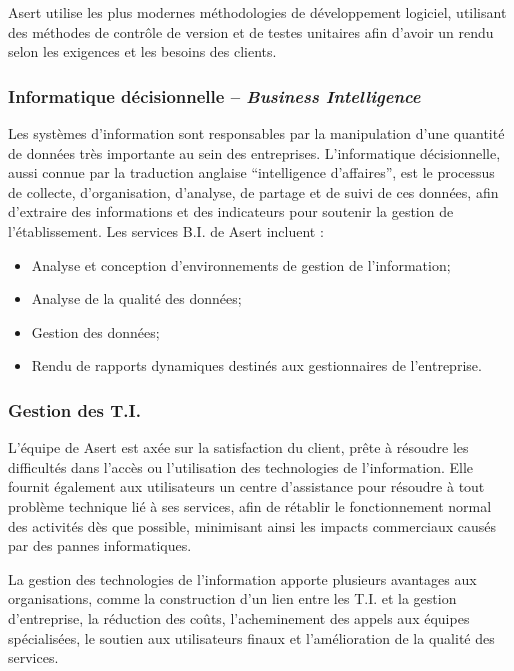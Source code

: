Asert utilise les plus modernes méthodologies de développement logiciel, utilisant des méthodes de contrôle de version et de testes unitaires afin d'avoir un rendu selon les exigences et les besoins des clients.

\subsubsection{Informatique décisionnelle -- \textit{Business Intelligence}}

Les systèmes d'information sont responsables par la manipulation d'une quantité de données très importante au sein des entreprises. L'informatique décisionnelle, aussi connue par la traduction anglaise ``intelligence d'affaires'', est le processus de collecte, d'organisation, d'analyse, de partage et de suivi de ces données, afin d'extraire des informations et des indicateurs pour soutenir la gestion de l'établissement. Les services B.I. de Asert incluent :

\begin{itemize}
\item Analyse et conception d'environnements de gestion de l'information;
\item Analyse de la qualité des données;
\item Gestion des données;
\item Rendu de rapports dynamiques destinés aux gestionnaires de l'entreprise.
\end{itemize}

\subsubsection{Gestion des T.I.}

L'équipe de Asert est axée sur la satisfaction du client, prête à résoudre les difficultés dans l'accès ou l'utilisation des technologies de l'information. Elle fournit également aux utilisateurs un centre d'assistance pour résoudre à tout problème technique lié à ses services, afin de rétablir le fonctionnement normal des activités dès que possible, minimisant ainsi les impacts commerciaux causés par des pannes informatiques.

La gestion des technologies de l'information apporte plusieurs avantages aux organisations, comme la construction d'un lien entre les T.I. et la gestion d'entreprise, la réduction des coûts, l'acheminement des appels aux équipes spécialisées, le soutien aux utilisateurs finaux  et l'amélioration de la qualité des services.

